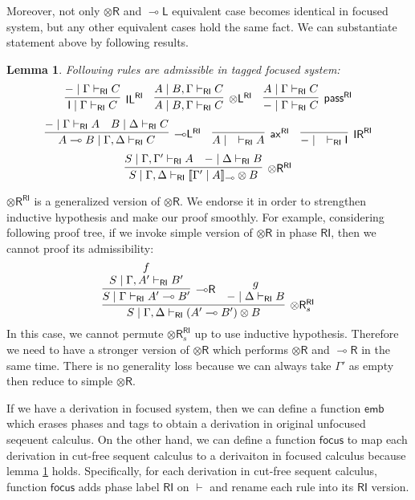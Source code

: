 \documentclass[submission,copyright,creativecommons]{eptcs}
\newtheorem{lemma}[theorem]{Lemma}
\theoremstyle{definition}
\newcommand{\ldbc}{[\![}
\newcommand{\rdbc}{]\!]}
\newcommand{\tl}{\otimes \mathsf{L}}
\newcommand{\tr}{\otimes \mathsf{R}}
\newcommand{\lright}{{\multimap}\mathsf{R}}
\newcommand{\lleft}{{\multimap}\mathsf{L}}
\newcommand{\pass}{\mathsf{pass}}
\newcommand{\unitl}{\mathsf{IL}}
\newcommand{\unitr}{\mathsf{IR}}
\newcommand{\ax}{\mathsf{ax}}
\newcommand{\ot}{\otimes}
\newcommand{\lolli}{\multimap}
\newcommand{\I}{\mathsf{I}}
\newcommand{\RI}{\mathsf{RI}}
\begin{document}
Moreover, not only $\tr$ and $\lleft$ equivalent case becomes identical in focused system, but any other equivalent cases hold the same fact.
We can substantiate statement above by following results.
\begin{lemma}\label{AdmissibleInRI}
  Following rules are admissible in tagged focused system:
  \begin{displaymath}
    \infer[\unitl^{\RI}]{\I \mid \Gamma \vdash_{\RI} C}{- \mid \Gamma \vdash_{\RI} C}
    \quad
    \infer[\tl^{\RI}]{A \mid B, \Gamma \vdash_{\RI} C}{A \mid B, \Gamma \vdash_{\RI} C}
    \quad
    \infer[\pass^{\RI}]{- \mid \Gamma \vdash_{\RI} C}{A \mid \Gamma \vdash_{\RI} C}
  \end{displaymath}
  \begin{displaymath}
    \infer[\lleft^{\RI}]{A \lolli B \mid \Gamma , \Delta \vdash_{\RI} C}{
    - \mid \Gamma \vdash_{\RI} A
    &
    B \mid \Delta \vdash_{\RI} C
    }
    \quad
    \infer[\ax^{\RI}]{A \mid \quad \vdash_{\RI} A}{}
    \quad
    \infer[\unitr^{\RI}]{- \mid \quad \vdash_{\RI} \I}{}
  \end{displaymath}
  \begin{displaymath}
    \infer[\tr^{\RI}]{S \mid \Gamma , \Delta \vdash_{\RI} \ldbc \Gamma' \mid A \rdbc_{\lolli} \ot B}{
      S \mid \Gamma , \Gamma' \vdash_{\RI} A
      &
      - \mid \Delta \vdash_{\RI} B
    }
  \end{displaymath}
\end{lemma}

$\tr^{\RI}$ is a generalized version of $\tr$.
We endorse it in order to strengthen inductive hypothesis and make our proof smoothly.
For example, considering following proof tree, if we invoke simple version of $\tr$ in phase $\RI$, then we cannot proof its admissibility:
\begin{displaymath}
  \infer[\tr^{\RI}_s]{S \mid \Gamma , \Delta \vdash_{\RI} (A' \lolli B') \ot B}{
    \infer[\lright]{S \mid \Gamma \vdash_{\RI} A' \lolli B'}{
      \deduce{S \mid \Gamma , A' \vdash_{\RI} B'}{f}
    }
    &
    \deduce{- \mid \Delta \vdash_{\RI} B}{g}
  }
\end{displaymath}
In this case, we cannot permute $\tr^{\RI}_s$ up to use inductive hypothesis.
Therefore we need to have a stronger version of $\tr$ which performs $\tr$ and $\lright$ in the same time.
There is no generality loss because we can always take $\Gamma'$ as empty then reduce to simple $\tr$.

If we have a derivation in focused system, then we can define a function $\mathsf{emb}$ which erases phases and tags to obtain a derivation in original unfocused seqeuent calculus.
On the other hand, we can define a function $\mathsf{focus}$ to map each derivation in cut-free sequent calculus to a derivaiton in focused calculus because lemma \ref{AdmissibleInRI} holds.
Specifically, for each derivation in cut-free sequent calculus, function $\mathsf{focus}$ adds phase label $\RI$ on $\vdash$ and rename each rule into its $\RI$ version.
\end{document}
